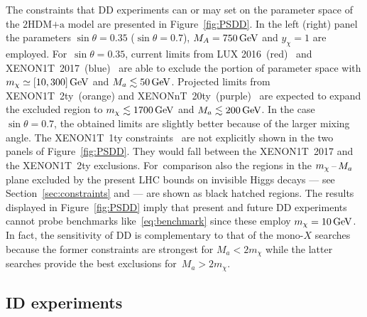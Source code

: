 \documentclass[a4paper, 11pt,notoc]{article}
\newcommand{\hdma}{\ensuremath{\textrm{2HDM+a}}\xspace}
\begin{document}
The constraints that DD experiments can or may set on the parameter space of the \hdma model are presented in Figure~\ref{fig:PSDD}. In the left (right) panel the parameters $\sin \theta = 0.35$ ($\sin \theta = 0.7$), $M_A = 750 \, {\rm GeV}$ and $y_\chi = 1$ are employed. For~$\sin \theta = 0.35$,  current limits from LUX 2016~(red)~\cite{Akerib:2016vxi} and  XENON1T~2017~(blue)~\cite{Aprile:2017iyp} are able to exclude the portion of parameter space with $m_\chi \simeq [10, 300 ]\, {\rm GeV}$ and $M_a \lesssim 50 \, {\rm GeV}$. Projected limits from XENON1T~2ty~(orange) and XENONnT~20ty~(purple)~\cite{Aprile:2015uzo} are expected to expand the excluded region to $m_\chi \lesssim 1700 \, {\rm GeV}$ and $M_a \lesssim 200 \, {\rm GeV}$. In the case $\sin \theta = 0.7$, the obtained limits are slightly better because of the larger mixing angle.  The XENON1T~1ty constraints~\cite{Aprile:2018dbl} are not explicitly shown  in the two panels of Figure~\ref{fig:PSDD}. They would fall between the  XENON1T~2017 and the XENON1T~2ty exclusions. For~comparison also the regions in the $m_\chi \hspace{0.5mm}$--$\hspace{0.5mm} M_a$ plane excluded by the present  LHC bounds on invisible Higgs decays --- see Section~\ref{sec:constraints} and \cite{Bauer:2017ota} --- are shown as black hatched regions.  The results displayed in Figure~\ref{fig:PSDD} imply that present and future DD experiments cannot probe benchmarks like~\eqref{eq:benchmark} since these employ $m_\chi = 10 \, {\rm GeV}$. In fact, the sensitivity of DD is complementary to that of the mono-$X$ searches because the former constraints are strongest for $M_a < 2 m_\chi$ while the latter searches provide the best exclusions for~$M_a > 2 m_\chi$. 

\subsection{ID experiments}
\end{document}
